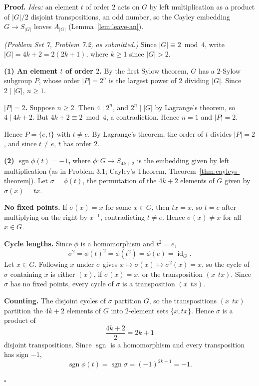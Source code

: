 \documentclass[11pt]{report}
\renewenvironment{proof}[1][Proof]{\noindent\textbf{#1.} }{\hfill$\square$\par\vspace{5pt}}
\begin{document}
\begin{proof}
\textit{Idea:} an element $t$ of order $2$ acts on $G$ by left multiplication as a product of $|G|/2$ disjoint transpositions, an odd number, so the Cayley embedding $G \to S_{|G|}$ leaves $A_{|G|}$ (Lemma~\ref{lem:leave-an}).\par
\textit{(Problem Set 7, Problem 7.2, as submitted.)} Since $|G| \equiv 2 \bmod 4$, write $|G| = 4k + 2 = 2(2k+1)$, where $k \geq 1$ since $|G| > 2$.

\textbf{(1) An element $t$ of order $2$.} By the first Sylow theorem, $G$ has a $2$-Sylow subgroup $P$, whose order $|P| = 2^n$ is the largest power of $2$ dividing $|G|$. Since $2 \mid |G|$, $n \geq 1$.

\textbf{$|P| = 2$.} Suppose $n \geq 2$. Then $4 \mid 2^n$, and $2^n \mid |G|$ by Lagrange's theorem, so $4 \mid 4k + 2$. But $4k + 2 \equiv 2 \bmod 4$, a contradiction. Hence $n = 1$ and $|P| = 2$.

Hence $P = \{e, t\}$ with $t \neq e$. By Lagrange's theorem, the order of $t$ divides $|P| = 2$, and since $t \neq e$, $t$ has order $2$.

\textbf{(2) $\operatorname{sgn}\phi(t) = -1$,} where $\phi : G \to S_{4k+2}$ is the embedding given by left multiplication (as in Problem 3.1; Cayley's Theorem, Theorem~\ref{thm:cayleys-theorem}). Let $\sigma = \phi(t)$, the permutation of the $4k+2$ elements of $G$ given by $\sigma(x) = tx$.

\textbf{No fixed points.} If $\sigma(x) = x$ for some $x \in G$, then $tx = x$, so $t = e$ after multiplying on the right by $x^{-1}$, contradicting $t \neq e$. Hence $\sigma(x) \neq x$ for all $x \in G$.

\textbf{Cycle lengths.} Since $\phi$ is a homomorphism and $t^2 = e$,
\[
\sigma^2 = \phi(t)^2 = \phi(t^2) = \phi(e) = \operatorname{id}_G.
\]
Let $x \in G$. Following $x$ under $\sigma$ gives $x \mapsto \sigma(x) \mapsto \sigma^2(x) = x$, so the cycle of $\sigma$ containing $x$ is either $(x)$, if $\sigma(x) = x$, or the transposition $(x\ \ tx)$. Since $\sigma$ has no fixed points, every cycle of $\sigma$ is a transposition $(x\ \ tx)$.

\textbf{Counting.} The disjoint cycles of $\sigma$ partition $G$, so the transpositions $(x\ \ tx)$ partition the $4k+2$ elements of $G$ into $2$-element sets $\{x, tx\}$. Hence $\sigma$ is a product of
\[
\frac{4k+2}{2} = 2k+1
\]
disjoint transpositions. Since $\operatorname{sgn}$ is a homomorphism and every transposition has sign $-1$,
\[
\operatorname{sgn}\phi(t) = \operatorname{sgn}\sigma = (-1)^{2k+1} = -1.
\]


\end{proof}
\end{document}
